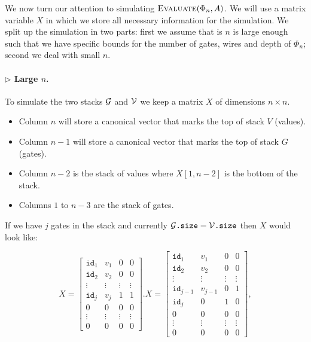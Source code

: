 We now turn our attention to simulating $\textsc{Evaluate}(\Phi_n,A)$. We will use a matrix variable $X$
in which we store all necessary information for the simulation. We split up the simulation in two parts:
first we assume that is $n$ is large enough such that we have specific bounds for the number of gates, wires
and depth of $\Phi_n$; second we deal with small $n$.

\paragraph{$\rhd$  Large $n$.}
    To simulate the two stacks $\mathcal{G}$ and $\mathcal{V}$ we keep a matrix $X$ of dimensions $n \times n$.

    \begin{itemize}
        \item Column $n$ will store a canonical vector that marks the top of stack $V$ (values).
        \item Column $n-1$ will store a canonical vector that marks the top of stack $G$ (gates).
        \item Column $n-2$ is the stack of values where $X[1, n-2]$ is the bottom of the stack.
        \item Columns $1$ to $n-3$ are the stack of gates.
    \end{itemize}


  
    If we have $j$ gates in the stack and currently $\mathcal{G}\texttt{.size}=\mathcal{V}\texttt{.size}$ then $X$ would look like:

    \[
    X = \begin{bmatrix}
        \texttt{id}_1 & v_1 & 0 & 0 \\
        \texttt{id}_2 & v_2 & 0 & 0 \\
        \vdots & \vdots & \vdots & \vdots \\
        \texttt{id}_j & v_j & 1 & 1 \\
        0 & 0 & 0 & 0 \\
        \vdots & \vdots & \vdots & \vdots \\
        0 & 0 & 0 & 0
    \end{bmatrix}. X = \begin{bmatrix}
        \texttt{id}_1 & v_1 & 0 & 0 \\
        \texttt{id}_2 & v_2 & 0 & 0 \\
        \vdots & \vdots & \vdots & \vdots \\
        \texttt{id}_{j-1} & v_{j-1} & 0 & 1 \\
        \texttt{id}_j & 0 & 1 & 0 \\
        0 & 0 & 0 & 0 \\
        \vdots & \vdots & \vdots & \vdots \\
        0 & 0 & 0 & 0
    \end{bmatrix},
    \]

